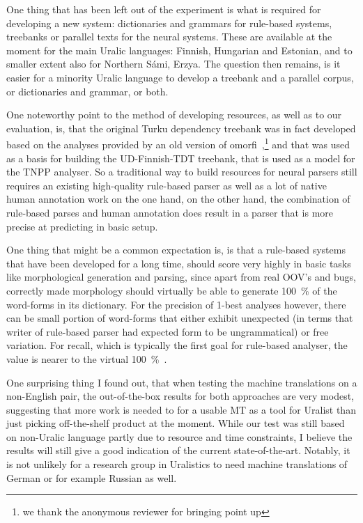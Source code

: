 \documentclass{flammie}
\begin{document}
One thing that has been left out of the experiment is what is required for
developing a new system: dictionaries and grammars for rule-based systems,
treebanks or parallel texts for the neural systems. These are available at the
moment for the main Uralic languages: Finnish, Hungarian and Estonian, and to
smaller extent also for Northern Sámi, Erzya. The question then remains, is it
easier for a minority Uralic language to develop a treebank and a parallel
corpus, or dictionaries and grammar, or both.

One noteworthy point to the method of developing resources, as well as to our
evaluation, is, that the original Turku dependency treebank was in fact
developed based on the analyses provided by an old version of
omorfi~\cite{haverinen2014building},\footnote{we thank the anonymous reviewer
for bringing point up} and that was used as a basis for building the
UD-Finnish-TDT treebank, that is used as a model for the TNPP analyser. So a
traditional way to build resources for neural parsers still requires an existing
high-quality rule-based parser as well as a lot of native human annotation work
on the one hand, on the other hand, the combination of rule-based parses and
human annotation does result in a parser that is more precise at predicting in
basic setup.

One thing that might be a common expectation is, is that a rule-based systems
that have been developed for a long time, should score very highly in basic
tasks like morphological generation and parsing, since apart from real OOV's and
bugs, correctly made morphology should virtually be able to generate 100~\% of
the word-forms in its dictionary. For the precision of 1-best analyses however,
there can be small portion of word-forms that either exhibit unexpected (in
terms that writer of rule-based parser had expected form to be ungrammatical)
or free variation. For recall, which is typically the first goal for rule-based
analyser, the value is nearer to the virtual 100~\%~\citep{omorfi}.

One surprising thing I found out, that when testing the machine translations on
a non-English pair, the out-of-the-box results for both approaches are very
modest, suggesting that more work is needed to for a usable MT as a tool for
Uralist than just picking off-the-shelf product at the moment. While our test
was still based on non-Uralic language partly due to resource and time
constraints, I believe the results will still give a good indication of the
current state-of-the-art. Notably, it is not unlikely for a research group in
Uralistics to need machine translations of German or for example Russian as
well.
\end{document}
